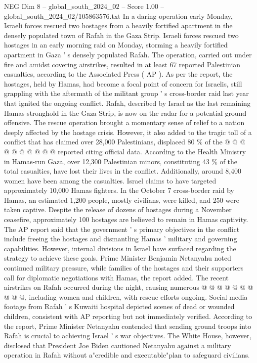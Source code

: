 \begin{textsample}{NEG Dim 8 – global\_south\_2024\_02 – Score 1.00 – global\_south\_2024\_02/105863576.txt}  \label{ex:f8_neg_255}
In a daring operation early Monday, Israeli forces rescued two hostages from a heavily fortified apartment in the densely populated town of Rafah in the Gaza Strip.
Israeli forces rescued two hostages in an early morning raid on Monday, storming a heavily fortified apartment in Gaza ' s densely populated Rafah.
The operation, carried out under fire and amidst covering airstrikes, resulted in at least 67 reported Palestinian casualties, according to the Associated Press ( AP ).
As per the report, the hostages, held by Hamas, had become a focal point of concern for Israelis, still grappling with the aftermath of the militant group ' s cross-border raid last year that ignited the ongoing conflict.
Rafah, described by Israel as the last remaining Hamas stronghold in the Gaza Strip, is now on the radar for a potential ground offensive.
The rescue operation brought a momentary sense of relief to a nation deeply affected by the hostage crisis.
However, it also added to the tragic toll of a conflict that has claimed over 28,000 Palestinians, displaced 80 \% of the @ @ @ @ @ @ @ @ @ @ reported citing official data.
According to the Health Ministry in Hamas-run Gaza, over 12,300 Palestinian minors, constituting 43 \% of the total casualties, have lost their lives in the conflict.
Additionally, around 8,400 women have been among the casualties.
Israel claims to have targeted approximately 10,000 Hamas fighters.
In the October 7 cross-border raid by Hamas, an estimated 1,200 people, mostly civilians, were killed, and 250 were taken captive.
Despite the release of dozens of hostages during a November ceasefire, approximately 100 hostages are believed to remain in Hamas captivity.
The AP report said that the government ' s primary objectives in the conflict include freeing the hostages and dismantling Hamas ' military and governing capabilities.
However, internal divisions in Israel have surfaced regarding the strategy to achieve these goals.
Prime Minister Benjamin Netanyahu noted continued military pressure, while families of the hostages and their supporters call for diplomatic negotiations with Hamas, the report added.
The recent airstrikes on Rafah occurred during the night, causing numerous @ @ @ @ @ @ @ @ @ @, including women and children, with rescue efforts ongoing.
Social media footage from Rafah ' s Kuwaiti hospital depicted scenes of dead or wounded children, consistent with AP reporting but not immediately verified.
According to the report, Prime Minister Netanyahu contended that sending ground troops into Rafah is crucial to achieving Israel ' s war objectives.
The White House, however, disclosed that President Joe Biden cautioned Netanyahu against a military operation in Rafah without a"credible and executable"plan to safeguard civilians.

\end{textsample}
